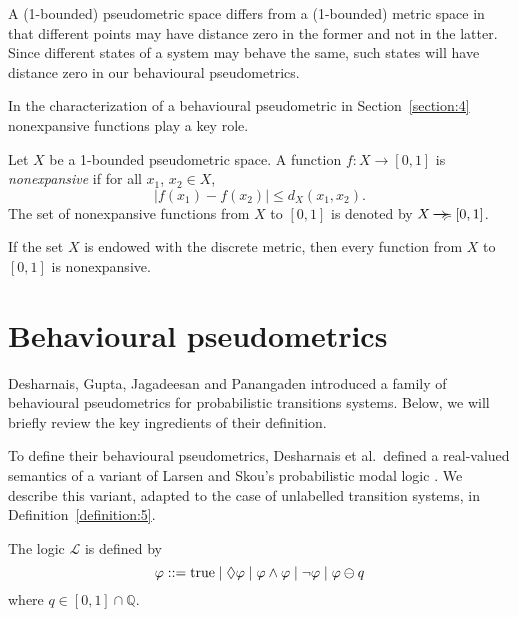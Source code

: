 \documentclass{LMCS}
\newcommand{\ndi}{\mathbin{\raisebox{0.15ex}{-\hspace{-0.2em}-\hspace{-0.2em}-\hspace{-0.2em}-\hspace{-0.2em}-\hspace{-0.2em}-}\hspace{-0.7em}\succcurlyeq}}
\newcommand{\modality}{\lozenge}
\begin{document}
A (1-bounded) pseudometric space differs from a (1-bounded) metric space
in that different points may have distance zero in the former and not in
the latter.  Since different states of a system may behave the same, 
such states will have distance zero in our behavioural pseudometrics.

In the characterization of a behavioural pseudometric in 
Section~\ref{section:4} nonexpansive functions play a key role.

\begin{defi}
Let $X$ be a 1-bounded pseudometric space.  A function $f : X \to [0, 1]$
is {\sl nonexpansive\/} if for all $x_1$, $x_2 \in X$,
\begin{displaymath}
| f(x_1) - f(x_2) | \leq d_X(x_1, x_2).
\end{displaymath}
The set of nonexpansive functions from $X$ to $[0, 1]$ is denoted by
$X \ndi [0, 1]$.
\end{defi}

\begin{exa}
If the set $X$ is endowed with the discrete metric, then every function
from $X$ to $[0, 1]$ is nonexpansive.
\end{exa}

\section{Behavioural pseudometrics}
\label{section:3}

Desharnais, Gupta, Jagadeesan and Panangaden \cite{DGJP04:tcs} introduced 
a family of behavioural pseudometrics for probabilistic transitions systems.  
Below, we will briefly review the key ingredients of their definition.  

To define their behavioural pseudometrics, Desharnais et al.\ defined a 
real-valued semantics of a variant of Larsen and Skou's probabilistic
modal logic \cite{LS91:ic}.  We describe this variant, adapted to the case 
of unlabelled transition systems, in Definition~\ref{definition:5}.

\begin{defi}
\label{definition:5}
The logic $\mathcal{L}$ is defined by
\begin{displaymath}
\varphi ::=  \mbox{\rm true}
        \mid \modality \varphi
        \mid \varphi \wedge \varphi
        \mid \neg \varphi
        \mid \varphi \ominus q
\end{displaymath}
where $q \in [0, 1] \cap \mathbb{Q}$.
\end{defi}
\end{document}
